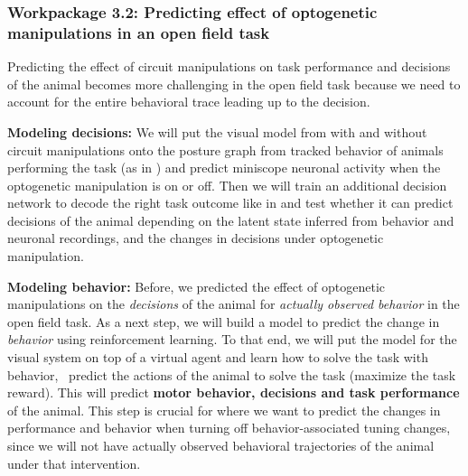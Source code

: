 \documentclass[B2,COG]{ercgrant}
\begin{document}
\subsubsection{Workpackage 3.2: Predicting effect of optogenetic manipulations in an open field task\hfill{}}

Predicting the effect of circuit manipulations on task performance and decisions of the animal becomes more challenging in the open field task because we need to account for the entire behavioral trace leading up to the decision. 

\textbf{Modeling decisions:} 
We will put the visual model from  with and without circuit manipulations onto the posture graph from tracked behavior of animals performing the task (as in ) and predict miniscope neuronal activity when the optogenetic manipulation is on or off. 
Then we will train an additional decision network to decode the right task outcome like in  and test whether it can predict decisions of the animal depending on the latent state inferred from behavior and neuronal recordings, and the changes in decisions under optogenetic manipulation. 

\textbf{Modeling behavior:} 
Before, we predicted the effect of optogenetic manipulations on the \textit{decisions} of the animal for \textit{actually observed behavior} in the open field task. 
As a next step, we will build a model to predict the change in \textit{behavior} using reinforcement learning.
To that end, we will put the model for the visual system on top of a virtual agent and learn how to solve the task with behavior, \ie\ predict the actions of the animal to solve the task (maximize the task reward). 
This will predict \textbf{motor behavior, decisions and task performance} of the animal. 
This step is crucial for  where we want to predict the changes in performance and behavior when turning off behavior-associated tuning changes, since we will not have actually observed behavioral trajectories of the animal under that intervention. 
\end{document}
